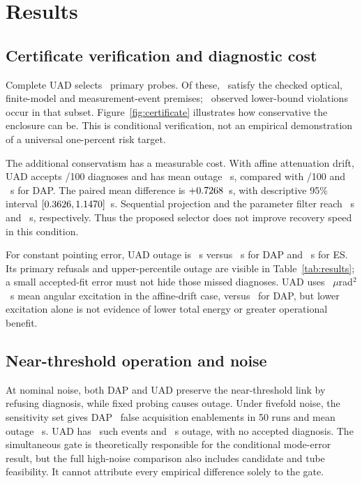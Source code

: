 \documentclass[10pt,journal]{IEEEtran}
\begin{document}
\section{Results}
\subsection{Certificate verification and diagnostic cost}
Complete UAD selects \SelectedCertificates\ primary probes. Of these, \ValidCertificates\ satisfy the checked optical, finite-model and measurement-event premises; \ValidViolations\ observed lower-bound violations occur in that subset. Figure~\ref{fig:certificate} illustrates how conservative the enclosure can be. This is conditional verification, not an empirical demonstration of a universal one-percent risk target.

The additional conservatism has a measurable cost. With affine attenuation drift, UAD accepts \UADDriftAccepted/100 diagnoses and has mean outage \UADDriftOutage~s, compared with \DAPDriftAccepted/100 and \DAPDriftOutage~s for DAP. The paired mean difference is $+0.7268$~s, with descriptive 95\% interval $[0.3626,1.1470]$~s. Sequential projection and the parameter filter reach \FixedDriftOutage~s and \KFDriftOutage~s, respectively. Thus the proposed selector does not improve recovery speed in this condition.

For constant pointing error, UAD outage is \UADPointingOutage~s versus \DAPPointingOutage~s for DAP and \ESPointingOutage~s for ES. Its primary refusals and upper-percentile outage are visible in Table~\ref{tab:results}; a small accepted-fit error must not hide those missed diagnoses. UAD uses \UADDriftEnergy~$\mu$rad$^2$~s mean angular excitation in the affine-drift case, versus \DAPDriftEnergy\ for DAP, but lower excitation alone is not evidence of lower total energy or greater operational benefit.

\subsection{Near-threshold operation and noise}
At nominal noise, both DAP and UAD preserve the near-threshold link by refusing diagnosis, while fixed probing causes outage. Under fivefold noise, the sensitivity set gives DAP \DAPNoiseFalseAcq\ false acquisition enablements in 50 runs and mean outage \DAPNoiseNearOutage~s. UAD has \UADNoiseFalseAcq\ such events and \UADNoiseNearOutage~s outage, with no accepted diagnosis. The simultaneous gate is theoretically responsible for the conditional mode-error result, but the full high-noise comparison also includes candidate and tube feasibility. It cannot attribute every empirical difference solely to the gate.
\end{document}
